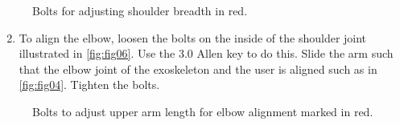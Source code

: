 \begin{figure}[H]
	\centering
	\begin{center}
	\end{center}
	\caption{Bolts for adjusting shoulder breadth in red.}
	\label{fig:fig05}
\end{figure}



\begin{enumerate}[]
	\setcounter{enumi}{1}
	\item To align the elbow, loosen the bolts on the inside of the shoulder joint illustrated in \autoref{fig:fig06}. Use the 3.0 Allen key to do this. Slide the arm such that the elbow joint of the exoskeleton and the user is aligned such as in \autoref{fig:fig04}. Tighten the bolts.
\end{enumerate}

\begin{figure}[H]
	\centering
	\begin{center}
	\end{center}
	\caption{Bolts to adjust upper arm length for elbow alignment marked in red.}
	\label{fig:fig06}
\end{figure}



